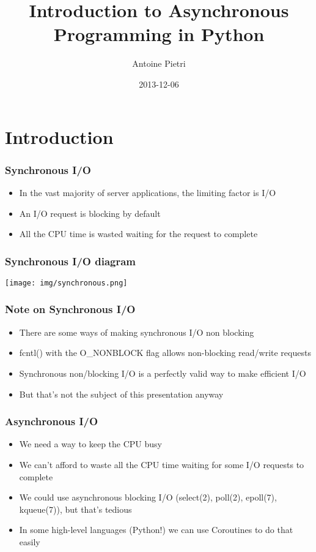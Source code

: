 \documentclass[ignorenonframetext,]{beamer}
\title{Introduction to Asynchronous Programming in Python}
\author{Antoine Pietri}
\date{2013-12-06}
\begin{document}
\frame{\titlepage}

\section{Introduction}

\begin{frame}[fragile]\frametitle{Synchronous I/O}

\begin{itemize}[<+->]
\itemsep1pt\parskip0pt
\item
  In the vast majority of server applications, the limiting factor is
  I/O
\item
  An I/O request is blocking by default
\item
  All the CPU time is wasted waiting for the request to complete
\end{itemize}

\end{frame}

\begin{frame}\frametitle{Synchronous I/O diagram}

\begin{center}
 \texttt{[image: img/synchronous.png]}
\end{center}

\end{frame}

\begin{frame}[fragile]\frametitle{Note on Synchronous I/O}

\begin{itemize}[<+->]
\itemsep1pt\parskip0pt
\item
  There are some ways of making synchronous I/O non blocking
\item
  fcntl() with the O\_NONBLOCK flag allows non-blocking read/write
  requests
\item
  Synchronous non/blocking I/O is a perfectly valid way to make
  efficient I/O
\item
  But that's not the subject of this presentation anyway
\end{itemize}

\end{frame}

\begin{frame}[fragile]\frametitle{Asynchronous I/O}

\begin{itemize}[<+->]
\itemsep1pt\parskip0pt
\item
  We need a way to keep the CPU busy
\item
  We can't afford to waste all the CPU time waiting for some I/O
  requests to complete
\item
  We could use asynchronous blocking I/O (select(2), poll(2), epoll(7),
  kqueue(7)), but that's tedious
\item
  In some high-level languages (Python!) we can use Coroutines to do
  that easily
\end{itemize}

\end{frame}
\end{document}
